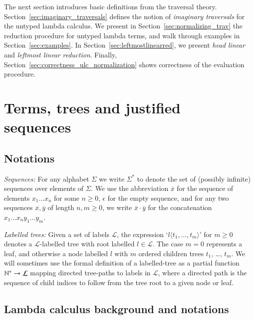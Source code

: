 \documentclass{elsarticle}
\theoremstyle{plain}
\theoremstyle{definition}
\begin{document}
The next section introduces basic definitions from the traversal theory. Section~\ref{sec:imaginary_traversals} defines the notion of \emph{imaginary traversals} for the untyped lambda calculus. We present in Section~\ref{sec:normalizing_trav} the reduction procedure for untyped lambda terms, and walk through examples in Section~\ref{sec:examples}. In Section~\ref{sec:leftmostlinearred}, we present \emph{head linear} and \emph{leftmost linear reduction}. Finally, Section~\ref{sec:correctness_ulc_normalization} shows correctness of the evaluation procedure.


\section{Terms, trees and justified sequences}
\label{sec:basic_def}
\subsection{Notations}
\emph{Sequences:} For any alphabet $\Sigma$ we write $\Sigma^*$ to denote the set of (possibly infinite) sequences over elements of $\Sigma$.
 We use the abbreviation $\overline{x}$ for the sequence of elements $x_1 \ldots x_n$ for some $n\geq0$, $\epsilon$ for the empty sequence, and for any two sequences $\overline{x}, \overline{y}$ of length $n,m\geq 0$, we write $\overline{x} \cdot \overline{y}$ for the concatenation $x_1 \ldots x_n y_1 \ldots y_m$.

 \emph{Labelled trees:} Given a set of labels $\mathcal{L}$, the expression `$l\langle t_1, \ldots, t_m \rangle$' for $m \geq 0$ denotes a $\mathcal{L}$-labelled tree with root labelled $l\in \mathcal{L}$. The case $m=0$ represents a leaf, and otherwise a node labelled $l$ with $m$ ordered children trees $t_1$, \ldots, $t_m$. We will sometimes use the formal definition of a labelled-tree as a partial function $\mathbb{N}^* \rightarrow \mathcal{L}$ mapping directed tree-paths to labels in $\mathcal{L}$, where a directed path is the sequence of child indices to follow from the tree root to a given node or leaf.

\subsection{Lambda calculus background and notations}
\label{sec:lambdacalculus_basics}
\end{document}
